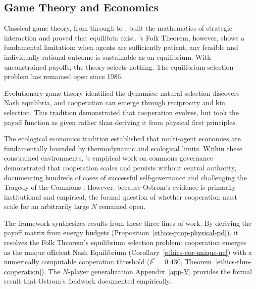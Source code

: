 \documentclass[11pt]{article}
\theoremstyle{plain}
\theoremstyle{definition}
\theoremstyle{remark}
\let\origsubsection\subsection
\renewcommand{\subsection}{\needspace{7\baselineskip}\origsubsection}
\begin{document}
\subsection{Game Theory and Economics}\label{game-theory-and-economics}

Classical game theory, from \citet{VonNeumann1944} through
\citeauthor{Nash1950}
\citetext{\citeyear{Nash1950}; \citeyear{Nash1951}} to
\citet{Fudenberg1986}, built the mathematics of strategic interaction
and proved that equilibria exist. \citet{Fudenberg1986}'s Folk Theorem,
however, shows a fundamental limitation: when agents are sufficiently
patient, any feasible and individually rational outcome is sustainable
as an equilibrium. With unconstrained payoffs, the theory selects
nothing. The equilibrium selection problem has remained open since 1986.

Evolutionary game theory
\citep{MaynardSmith1973, Hamilton1964a, Axelrod1984, Weibull1995}
identified the dynamics: natural selection discovers Nash equilibria,
and cooperation can emerge through reciprocity and kin selection. This
tradition demonstrated that cooperation evolves, but took the payoff
function as given rather than deriving it from physical first
principles.

The ecological economics tradition \citep{GeorgescuRoegen1971, Odum1971}
established that multi-agent economies are fundamentally bounded by
thermodynamic and ecological limits. Within these constrained
environments, \citet{Ostrom1990}'s \citeyearpar{Ostrom2005} empirical
work on commons governance demonstrated that cooperation scales and
persists without central authority, documenting hundreds of cases of
successful self-governance and challenging the Tragedy of the Commons
\citep{Hardin1968}. However, because Ostrom's evidence is primarily
institutional and empirical, the formal question of whether cooperation
must scale for an arbitrarily large \(N\) remained open.

The framework synthesizes results from these three lines of work. By
deriving the payoff matrix from energy budgets
(Proposition~\ref{ethics-prop-physical-pd}), it resolves the Folk
Theorem's equilibrium selection problem: cooperation emerges as the
unique efficient Nash Equilibrium (Corollary~\ref{ethics-cor-unique-ne})
with a numerically computable cooperation threshold
(\(\delta^* = 0.430\), Theorem~\ref{ethics-thm-cooperation}). The
\(N\)-player generalization Appendix~\ref{app-V} provides the formal
result that Ostrom's fieldwork documented empirically.
\end{document}
